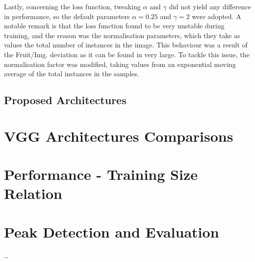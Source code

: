 Lastly, concerning the loss function, tweaking $\alpha$ and $\gamma$ did not yield any difference in performance, so the default parameters $\alpha=0.25$ and $\gamma=2$ were adopted. A notable remark is that the loss function found to be very unstable during training, and the reason was the normalisation parameters, which they take as values the total number of instances in the image. This behaviour was a result of the Fruit/Img. deviation as it can be found in  very large. To tackle this issue, the normalisation factor was modified, taking values from an exponential moving average of the total instances in the samples.
 
\subsection{Proposed Architectures}

\section{VGG Architectures Comparisons}

\section{Performance - Training Size Relation}

\section{Peak Detection and Evaluation}

\dots